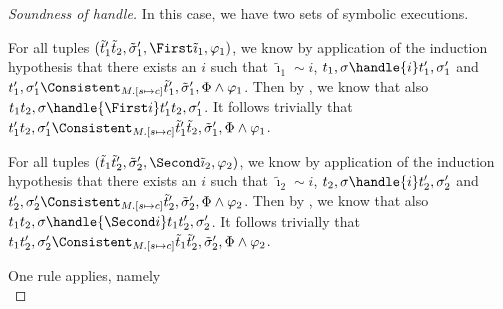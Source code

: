 \begin{proof}[Soundness of handle]
{In this case, we have two sets of symbolic executions.

  For all tuples $(\tilde{t}_1'\And\tilde{t}_2,\tilde{\sigma}_1',\First \tilde{\imath}_1,\phi_1)$,
  we know by application of the induction hypothesis that there exists an $i$ such that
  $\tilde{\imath}_1\sim i$, $t_1,\sigma\handle{i}t_1',\sigma_1'$ and
  $t_1',\sigma_1'\Consistent_{M.[s\mapsto c]}\tilde{t}_1',\tilde{\sigma}_1',\Phi\land\phi_1$.
  Then by , we know that also $t_1\And t_2,\sigma\handle{\First i}t_1'\And t_2,\sigma_1'$.
  It follows trivially that $t_1'\And t_2,\sigma_1'\Consistent_{M.[s\mapsto c]}\tilde{t}_1'\And \tilde{t}_2,\tilde{\sigma}_1',\Phi\land\phi_1$.

  For all tuples $(\tilde{t}_1\And\tilde{t}_2',\tilde{\sigma}_2',\Second \tilde{\imath}_2,\phi_2)$,
  we know by application of the induction hypothesis that there exists an $i$ such that
  $\tilde{\imath}_2\sim i$, $t_2,\sigma\handle{i}t_2',\sigma_2'$ and
  $t_2',\sigma_2'\Consistent_{M.[s\mapsto c]}\tilde{t}_2',\tilde{\sigma}_2',\Phi\land\phi_2$.
  Then by , we know that also $t_1\And t_2,\sigma\handle{\Second i}t_1\And t_2',\sigma_2'$.
  It follows trivially that $t_1\And t_2',\sigma_2'\Consistent_{M.[s\mapsto c]}\tilde{t}_1\And \tilde{t}_2',\tilde{\sigma}_2',\Phi\land\phi_2$.
}
%
{One rule applies, namely \\
%
%
%
%
%
%
}

\end{proof}



